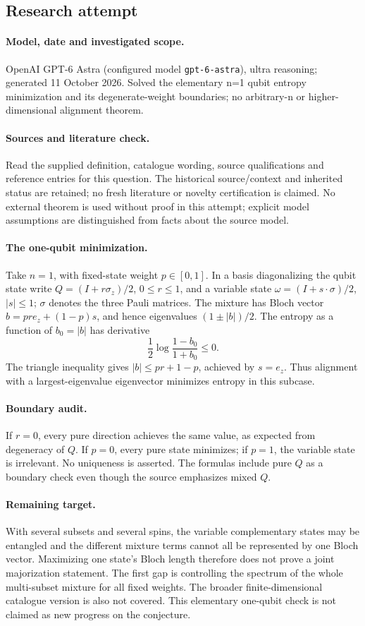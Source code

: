 \documentclass[11pt]{article}
\begin{document}
\subsection{Research attempt}
\paragraph{Model, date and investigated scope.}
OpenAI GPT-6 Astra (configured model \texttt{gpt-6-astra}), ultra reasoning; generated 11 October 2026. Solved the elementary n=1 qubit entropy minimization and its degenerate-weight boundaries; no arbitrary-n or higher-dimensional alignment theorem.

\paragraph{Sources and literature check.}
Read the supplied definition, catalogue wording, source qualifications and reference entries for this question. The historical source/context and inherited status are retained; no fresh literature or novelty certification is claimed. No external theorem is used without proof in this attempt; explicit model assumptions are distinguished from facts about the source model.

\paragraph{The one-qubit minimization.} Take \(n=1\), with fixed-state weight \(p\in[0,1]\). In a basis diagonalizing the qubit state write \(Q=(I+r\sigma_z)/2\), \(0\le r\le1\), and a variable state \(\omega=(I+s\cdot\sigma)/2\), \(|s|\le1\); \(\sigma\) denotes the three Pauli matrices. The mixture has Bloch vector \(b=pr e_z+(1-p)s\), and hence eigenvalues \((1\pm|b|)/2\). The entropy as a function of \(b_0=|b|\) has derivative
\[
 \frac12\log\frac{1-b_0}{1+b_0}\le0.
\]
The triangle inequality gives \(|b|\le pr+1-p\), achieved by \(s=e_z\). Thus alignment with a largest-eigenvalue eigenvector minimizes entropy in this subcase.
\paragraph{Boundary audit.} If \(r=0\), every pure direction achieves the same value, as expected from degeneracy of \(Q\). If \(p=0\), every pure state minimizes; if \(p=1\), the variable state is irrelevant. No uniqueness is asserted. The formulas include pure \(Q\) as a boundary check even though the source emphasizes mixed \(Q\).
\paragraph{Remaining target.} With several subsets and several spins, the variable complementary states may be entangled and the different mixture terms cannot all be represented by one Bloch vector. Maximizing one state's Bloch length therefore does not prove a joint majorization statement. The first gap is controlling the spectrum of the whole multi-subset mixture for all fixed weights. The broader finite-dimensional catalogue version is also not covered. This elementary one-qubit check is not claimed as new progress on the conjecture.
\end{document}
